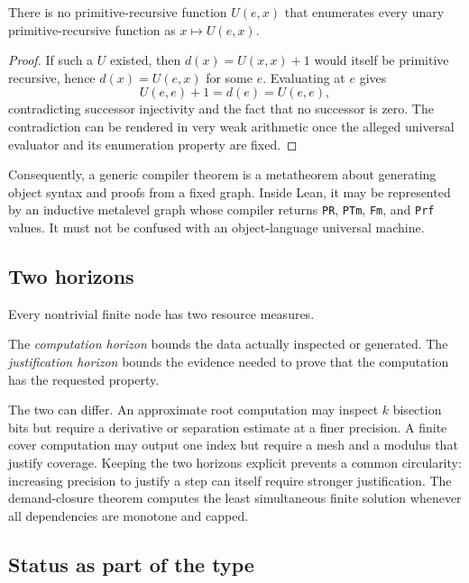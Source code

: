 \begin{barrier}
There is no primitive-recursive function \(U(e,x)\) that enumerates every unary primitive-recursive function as \(x\mapsto U(e,x)\).
\end{barrier}

\begin{proof}
If such a \(U\) existed, then \(d(x)=U(x,x)+1\) would itself be primitive recursive, hence \(d(x)=U(e,x)\) for some \(e\).  Evaluating at \(e\) gives
\[
  U(e,e)+1=d(e)=U(e,e),
\]
contradicting successor injectivity and the fact that no successor is zero.  The contradiction can be rendered in very weak arithmetic once the alleged universal evaluator and its enumeration property are fixed.
\end{proof}

Consequently, a generic compiler theorem is a metatheorem about generating object syntax and proofs from a fixed graph.  Inside Lean, it may be represented by an inductive metalevel graph whose compiler returns \texttt{PR}, \texttt{PTm}, \texttt{Fm}, and \texttt{Prf} values.  It must not be confused with an object-language universal machine.

\subsection{Two horizons}

Every nontrivial finite node has two resource measures.

\begin{definition}
The \emph{computation horizon} bounds the data actually inspected or generated.  The \emph{justification horizon} bounds the evidence needed to prove that the computation has the requested property.
\end{definition}

The two can differ.  An approximate root computation may inspect \(k\) bisection bits but require a derivative or separation estimate at a finer precision.  A finite cover computation may output one index but require a mesh and a modulus that justify coverage.  Keeping the two horizons explicit prevents a common circularity: increasing precision to justify a step can itself require stronger justification.  The demand-closure theorem computes the least simultaneous finite solution whenever all dependencies are monotone and capped.

\subsection{Status as part of the type}

